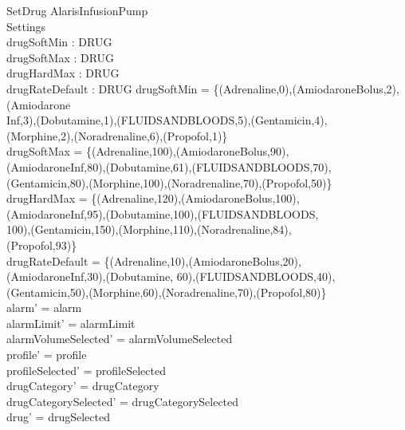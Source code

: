 \begin{schema}{SetDrug}
	\Delta AlarisInfusionPump\\
	 Settings\\
	drugSoftMin : DRUG \rel \nat\\
	drugSoftMax : DRUG \rel \nat\\
	drugHardMax : DRUG \rel \nat\\
	drugRateDefault : DRUG \rel \nat
	\where
	drugSoftMin = \{(Adrenaline,0),(AmiodaroneBolus,2),(Amiodarone\\
	Inf,3),(Dobutamine,1),(FLUIDSANDBLOODS,5),(Gentamicin,4),\\
	(Morphine,2),(Noradrenaline,6),(Propofol,1)\}\\
	drugSoftMax = \{(Adrenaline,100),(AmiodaroneBolus,90),\\
	(AmiodaroneInf,80),(Dobutamine,61),(FLUIDSANDBLOODS,70),\\
	(Gentamicin,80),(Morphine,100),(Noradrenaline,70),(Propofol,50)\}\\
	drugHardMax = \{(Adrenaline,120),(AmiodaroneBolus,100),\\
	(AmiodaroneInf,95),(Dobutamine,100),(FLUIDSANDBLOODS,\\
	100),(Gentamicin,150),(Morphine,110),(Noradrenaline,84),\\
	(Propofol,93)\}\\
	drugRateDefault = \{(Adrenaline,10),(AmiodaroneBolus,20),\\
	(AmiodaroneInf,30),(Dobutamine, 60),(FLUIDSANDBLOODS,40),\\
	\pagebreak
	(Gentamicin,50),(Morphine,60),(Noradrenaline,70),(Propofol,80)\}\\
	alarm' = alarm\\
	alarmLimit' = alarmLimit\\
	alarmVolumeSelected' = alarmVolumeSelected\\
	profile' = profile\\
	profileSelected' = profileSelected\\
	drugCategory' = drugCategory\\ 
	drugCategorySelected' = drugCategorySelected\\
	drug' = drugSelected\\ 

\end{schema}
